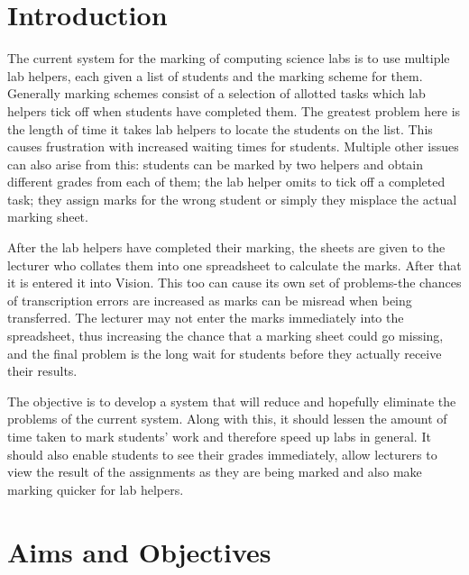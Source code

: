 \documentclass[11pt]{report}
\begin{document}
\tableofcontents
\newpage
\listoffigures
\newpage
\listoftables
\lstlistoflistings


\newpage   
\setcounter{page}{1}
\chapter{Introduction}

The current system for the marking of computing science labs is to use multiple lab helpers, each given a list of students and the marking scheme for them. Generally marking schemes consist of a selection of allotted  tasks which lab helpers tick off when students have completed them. The greatest problem here is the length of time it takes lab helpers to locate the students on the list. This causes frustration with increased waiting times for students.  Multiple other issues can also  arise from this: students can be marked by two helpers and obtain different grades from each of them; the lab helper omits to  tick off a completed task; they assign  marks for the wrong student or simply they misplace the actual marking sheet.

After the lab helpers have completed their marking, the sheets are given to the lecturer who collates them into one spreadsheet to calculate the marks. After that it is entered it into Vision. This too can cause its own set of problems-the chances of transcription errors are increased as marks can be misread  when being transferred. The lecturer may not enter the marks immediately into the spreadsheet, thus increasing the chance that a marking sheet could go missing, and the final problem is the long wait for students before they actually receive their results.

The objective is to develop a system that will reduce and hopefully eliminate the problems of the current system. Along with this, it should  lessen the amount of time taken to mark students’ work and therefore speed up labs in general. It should also enable students to see their grades immediately, allow lecturers to view the result of the assignments as they are being marked and also make marking quicker for lab helpers.




\newpage
\chapter{Aims and Objectives}
\end{document}
